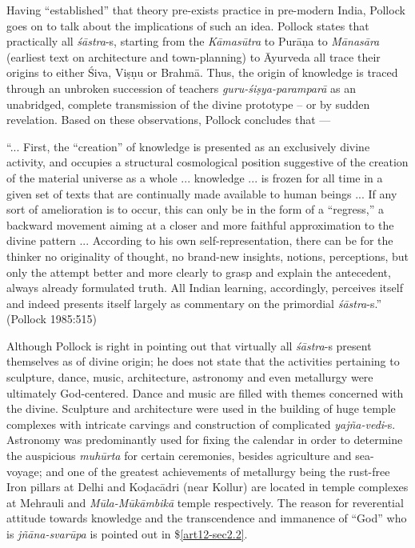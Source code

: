 Having ``established'' that theory pre-exists practice in pre-modern India, Pollock goes on to talk about the implications of such an idea. Pollock states that practically all {\sl śāstra}-s, starting from the {\sl Kāmasūtra} to Purāṇa to {\sl Mānasāra} (earliest text on architecture and town-planning) to Āyurveda all trace their origins  to either Śiva, Viṣṇu or Brahmā. Thus, the origin of knowledge is traced through an unbroken succession of teachers {\sl guru-śiṣya-paramparā} as an unabridged, complete transmission of the divine prototype -- or by sudden revelation. Based on these observations, Pollock concludes that ---

\newpage

\begin{myquote}
``... First, the ``creation'' of knowledge is presented as an exclusively divine activity, and occupies a structural cosmological position suggestive of the creation of the material universe as a whole ... knowledge ... is frozen for all time in a given set of texts that are continually made available to human beings ... If any sort of amelioration is to occur, this  can only be in the form of a ``regress,'' a backward movement aiming at a closer and more  faithful approximation to the divine pattern ...  According to his own self-representation, there can be for the thinker no originality of thought, no brand-new insights, notions, perceptions, but only the attempt better and more clearly to grasp and explain the antecedent, always already formulated truth. All Indian learning, accordingly, perceives itself and indeed presents itself largely as commentary on the primordial {\sl śāstra}-s.'' (Pollock 1985:515)
\end{myquote}

Although Pollock is right in pointing out that virtually all {\sl śāstra}-s present themselves as of divine origin; he does not state that the activities pertaining to sculpture, dance, music, architecture, astronomy and even metallurgy were ultimately God-centered. Dance and music are ﬁlled with themes concerned with the divine. Sculpture and architecture were used in the building of huge temple complexes with intricate carvings and construction of complicated {\sl yajña-vedi}-s. Astronomy was predominantly used for ﬁxing the calendar in order to determine the auspicious {\sl muhūrta} for certain ceremonies, besides agriculture and sea-voyage; and one of the greatest achievements of metallurgy being the rust-free Iron pillars at Delhi and Koḍacādri (near Kollur) are located in temple complexes at Mehrauli and {\sl Mūla-Mūkāmbikā} temple respectively. The reason for reverential attitude towards knowledge and the transcendence and immanence of ``God'' who is {\sl jñāna-svarūpa} is pointed out in \$\ref{art12-sec2.2}.

